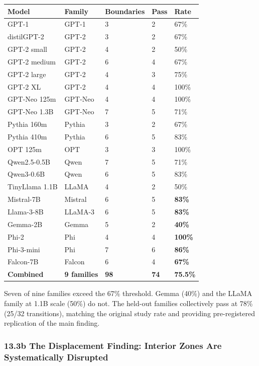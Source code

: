 \documentclass[
  11pt,
  letterpaper,
]{article}
\begin{document}
\begin{longtable}[]{@{}lllll@{}}
\toprule\noalign{}
Model & Family & Boundaries & Pass & Rate \\
\midrule\noalign{}
\endhead
\bottomrule\noalign{}
\endlastfoot
GPT-1 & GPT-1 & 3 & 2 & 67\% \\
distilGPT-2 & GPT-2 & 3 & 2 & 67\% \\
GPT-2 small & GPT-2 & 4 & 2 & 50\% \\
GPT-2 medium & GPT-2 & 6 & 4 & 67\% \\
GPT-2 large & GPT-2 & 4 & 3 & 75\% \\
GPT-2 XL & GPT-2 & 4 & 4 & 100\% \\
GPT-Neo 125m & GPT-Neo & 4 & 4 & 100\% \\
GPT-Neo 1.3B & GPT-Neo & 7 & 5 & 71\% \\
Pythia 160m & Pythia & 3 & 2 & 67\% \\
Pythia 410m & Pythia & 6 & 5 & 83\% \\
OPT 125m & OPT & 3 & 3 & 100\% \\
Qwen2.5-0.5B & Qwen & 7 & 5 & 71\% \\
Qwen3-0.6B & Qwen & 6 & 5 & 83\% \\
TinyLlama 1.1B & LLaMA & 4 & 2 & 50\% \\
Mistral-7B & Mistral & 6 & 5 & \textbf{83\%} \\
Llama-3-8B & LLaMA-3 & 6 & 5 & \textbf{83\%} \\
Gemma-2B & Gemma & 5 & 2 & \textbf{40\%} \\
Phi-2 & Phi & 4 & 4 & \textbf{100\%} \\
Phi-3-mini & Phi & 7 & 6 & \textbf{86\%} \\
Falcon-7B & Falcon & 6 & 4 & \textbf{67\%} \\
\textbf{Combined} & \textbf{9 families} & \textbf{98} & \textbf{74} &
\textbf{75.5\%} \\
\end{longtable}

Seven of nine families exceed the 67\% threshold. Gemma (40\%) and the
LLaMA family at 1.1B scale (50\%) do not. The held-out families
collectively pass at 78\% (25/32 transitions), matching the original
study rate and providing pre-registered replication of the main finding.

\subsubsection{13.3b The Displacement Finding: Interior Zones Are
Systematically
Disrupted}\label{b-the-displacement-finding-interior-zones-are-systematically-disrupted}
\end{document}
